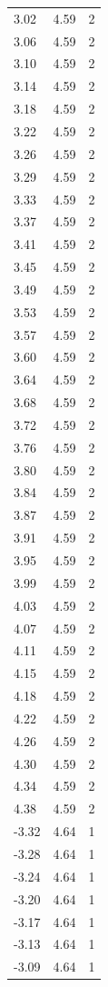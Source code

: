 \begin{longtable}{lrr}
  3.02 & 4.59 & 2 \\
  3.06 & 4.59 & 2 \\
  3.10 & 4.59 & 2 \\
  3.14 & 4.59 & 2 \\
  3.18 & 4.59 & 2 \\
  3.22 & 4.59 & 2 \\
  3.26 & 4.59 & 2 \\
  3.29 & 4.59 & 2 \\
  3.33 & 4.59 & 2 \\
  3.37 & 4.59 & 2 \\
  3.41 & 4.59 & 2 \\
  3.45 & 4.59 & 2 \\
  3.49 & 4.59 & 2 \\
  3.53 & 4.59 & 2 \\
  3.57 & 4.59 & 2 \\
  3.60 & 4.59 & 2 \\
  3.64 & 4.59 & 2 \\
  3.68 & 4.59 & 2 \\
  3.72 & 4.59 & 2 \\
  3.76 & 4.59 & 2 \\
  3.80 & 4.59 & 2 \\
  3.84 & 4.59 & 2 \\
  3.87 & 4.59 & 2 \\
  3.91 & 4.59 & 2 \\
  3.95 & 4.59 & 2 \\
  3.99 & 4.59 & 2 \\
  4.03 & 4.59 & 2 \\
  4.07 & 4.59 & 2 \\
  4.11 & 4.59 & 2 \\
  4.15 & 4.59 & 2 \\
  4.18 & 4.59 & 2 \\
  4.22 & 4.59 & 2 \\
  4.26 & 4.59 & 2 \\
  4.30 & 4.59 & 2 \\
  4.34 & 4.59 & 2 \\
  4.38 & 4.59 & 2 \\
  -3.32 & 4.64 & 1 \\
  -3.28 & 4.64 & 1 \\
  -3.24 & 4.64 & 1 \\
  -3.20 & 4.64 & 1 \\
  -3.17 & 4.64 & 1 \\
  -3.13 & 4.64 & 1 \\
  -3.09 & 4.64 & 1 \\

\end{longtable}
